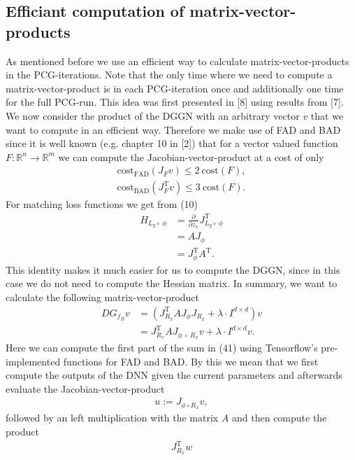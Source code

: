 \documentclass[conference]{IEEEtran}
\begin{document}
\subsection{Efficiant computation of matrix-vector-products}
\noindent
As mentioned before we use an efficient way to calculate matrix-vector-products in the PCG-iterations. Note that the only time where we need to compute a matrix-vector-product is in each PCG-iteration once and additionally one time for the full PCG-run. This idea was first presented in [8] using results from [7].\\ 
We now consider the product of the DGGN with an arbitrary vector $v$ that we want to compute in an efficient way.
Therefore we make use of FAD and BAD since it is well known (e.g. chapter 10 in [2]) that for a vector valued function $F:\mathbb{R}^{n}\rightarrow\mathbb{R}^{m}$ we can compute the Jacobian-vector-product at a cost of only
\begin{align}
\mathrm{cost}_{\text{FAD}}(J_{F}v)\leq 2\:\mathrm{cost}(F),\\
\mathrm{cost}_{\text{BAD}}(J_{F}^{\mathrm{T}}v)\leq 3\:\mathrm{cost}(F).
\end{align}
For matching loss functions we get from (10)
\begin{align}
H_{L_{y}\circ\:\phi} &= \frac{\partial}{\partial z_{x}}J_{L_{y}\circ\:\phi}^{\mathrm{T}}\\
&= AJ_{\phi} \\
&= J_{\phi}^{\mathrm{T}}A^{\mathrm{T}}.
\end{align}
This identity makes it much easier for us to compute the DGGN, since in this case we do not need to compute the Hessian matrix. In summary, we want to calculate the following matrix-vector-product
\begin{align}
DG_{f_{B}}v &=  \left(J_{R_{x}}^{\mathrm{T}}AJ_{\phi}J_{R_{x}} + \lambda\cdot I^{d\times d}\right)v\\
&= J_{R_{x}}^{\mathrm{T}}AJ_{\phi\:\circ\: R _{x}}v + \lambda\cdot I^{d\times d}v.
\end{align}
Here we can compute the first part of the sum in (41) using Tensorflow's pre-implemented functions for FAD and BAD. By this we mean that we first compute the outputs of the DNN given the current parameters and afterwards evaluate the Jacobian-vector-product 
\begin{align}
u := J_{\phi\circ R _{x}}v,
\end{align}
followed by an left multiplication with the matrix $A$ and then compute the product 
\begin{align}
J_{R_{x}}^{\mathrm{T}}w
\end{align}
\end{document}
